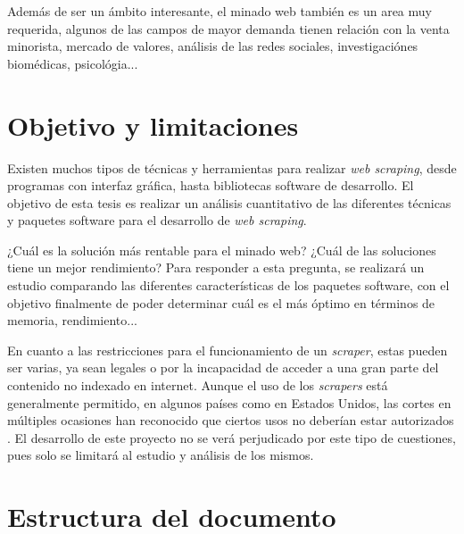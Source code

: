 Además de ser un ámbito interesante, el minado web también es un area muy requerida, algunos de las campos 
de mayor demanda tienen relación con la venta minorista, mercado de valores, análisis de las redes sociales, 
investigaciónes biomédicas, psicológia...

\section{Objetivo y limitaciones}
\label{sec:objetivo y limitaciones}

Existen muchos tipos de técnicas y herramientas para realizar \emph{web scraping}, desde programas con 
interfaz gráfica, hasta bibliotecas software de desarrollo. El objetivo de esta tesis es realizar un análisis
cuantitativo de las diferentes técnicas y paquetes software para el desarrollo de \emph{web scraping}.

¿Cuál es la solución más rentable para el minado web? ¿Cuál de las soluciones tiene un mejor rendimiento?
Para responder a esta pregunta, se realizará un estudio comparando las diferentes características de los
paquetes software, con el objetivo finalmente de poder determinar cuál es el más óptimo en términos de
memoria, rendimiento...

En cuanto a las restricciones para el funcionamiento de un \emph{scraper}, estas pueden ser varias, ya sean 
legales o por la incapacidad de acceder a una gran parte del contenido no indexado en internet. Aunque el 
uso de los \emph{scrapers} está generalmente permitido, en algunos países como en Estados Unidos, las 
cortes en múltiples ocasiones han reconocido que ciertos usos no deberían estar autorizados 
\cite{Andreas-Mehlfuhrer}. El desarrollo de este proyecto no se verá perjudicado por este tipo de 
cuestiones, pues solo se limitará al estudio y análisis de los mismos.

\section{Estructura del documento}
\label{sec:estructura del documento}

